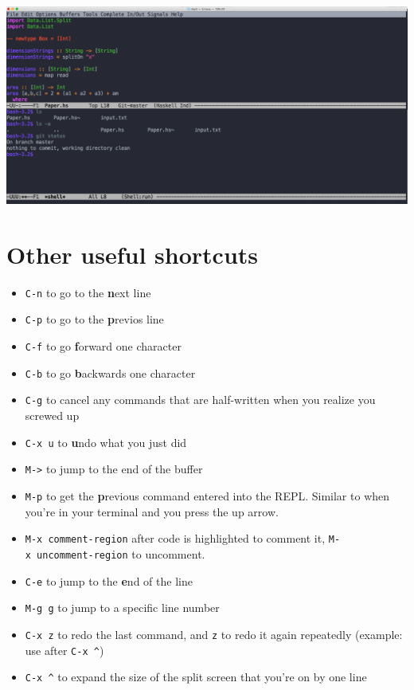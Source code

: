 \documentclass[12pt]{article}
\begin{document}
\begin{center}
\includegraphics[width=7in]{five}
\end{center}

\section{Other useful shortcuts}\label{other-useful-shortcuts}

\begin{itemize}
\item
  \texttt{C-n} to go to the \textbf{n}ext line
\item
  \texttt{C-p} to go to the \textbf{p}revios line
\item
  \texttt{C-f} to go \textbf{f}orward one character
\item
  \texttt{C-b} to go \textbf{b}ackwards one character
\item
  \texttt{C-g} to cancel any commands that are half-written when you
  realize you screwed up
\item
  \texttt{C-x\ u} to \textbf{u}ndo what you just did
\item
  \texttt{M-\textgreater{}} to jump to the end of the buffer
\item
  \texttt{M-p} to get the \textbf{p}revious command entered into the
  REPL. Similar to when you're in your terminal and you press the up
  arrow.
\item
  \texttt{M-x\ comment-region} after code is highlighted to comment it,
  \texttt{M-x\ uncomment-region} to uncomment.
\item
  \texttt{C-e} to jump to the \textbf{e}nd of the line
\item
  \texttt{M-g\ g} to jump to a specific line number
\item
  \texttt{C-x z} to redo the last command, and \texttt{z} to redo it again
  repeatedly (example: use after \texttt{C-x \^})
\item
  \texttt{C-x \^} to expand the size of the split screen that you're on
  by one line
\end{itemize}
\end{document}
